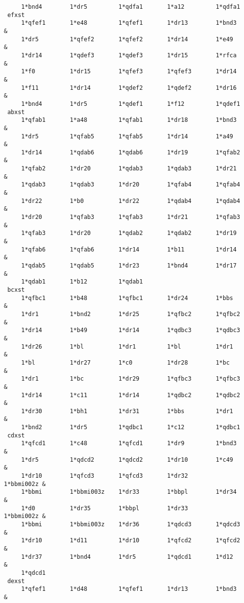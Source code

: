 \begin{footnotesize}
\begin{verbatim}
     1*bnd4        1*dr5         1*qdfa1       1*a12         1*qdfa1
 efxst
     1*qfef1       1*e48         1*qfef1       1*dr13        1*bnd3     &
     1*dr5         1*qfef2       1*qfef2       1*dr14        1*e49      &
     1*dr14        1*qdef3       1*qdef3       1*dr15        1*rfca     &
     1*f0          1*dr15        1*qfef3       1*qfef3       1*dr14     &
     1*f11         1*dr14        1*qdef2       1*qdef2       1*dr16     &
     1*bnd4        1*dr5         1*qdef1       1*f12         1*qdef1
 abxst
     1*qfab1       1*a48         1*qfab1       1*dr18        1*bnd3     &
     1*dr5         1*qfab5       1*qfab5       1*dr14        1*a49      &
     1*dr14        1*qdab6       1*qdab6       1*dr19        1*qfab2    &
     1*qfab2       1*dr20        1*qdab3       1*qdab3       1*dr21     &
     1*qdab3       1*qdab3       1*dr20        1*qfab4       1*qfab4    &
     1*dr22        1*b0          1*dr22        1*qdab4       1*qdab4    &
     1*dr20        1*qfab3       1*qfab3       1*dr21        1*qfab3    &
     1*qfab3       1*dr20        1*qdab2       1*qdab2       1*dr19     &
     1*qfab6       1*qfab6       1*dr14        1*b11         1*dr14     &
     1*qdab5       1*qdab5       1*dr23        1*bnd4        1*dr17     &
     1*qdab1       1*b12         1*qdab1
 bcxst
     1*qfbc1       1*b48         1*qfbc1       1*dr24        1*bbs      &
     1*dr1         1*bnd2        1*dr25        1*qfbc2       1*qfbc2    &
     1*dr14        1*b49         1*dr14        1*qdbc3       1*qdbc3    &
     1*dr26        1*bl          1*dr1         1*bl          1*dr1      &
     1*bl          1*dr27        1*c0          1*dr28        1*bc       &
     1*dr1         1*bc          1*dr29        1*qfbc3       1*qfbc3    &
     1*dr14        1*c11         1*dr14        1*qdbc2       1*qdbc2    &
     1*dr30        1*bh1         1*dr31        1*bbs         1*dr1      &
     1*bnd2        1*dr5         1*qdbc1       1*c12         1*qdbc1
 cdxst
     1*qfcd1       1*c48         1*qfcd1       1*dr9         1*bnd3     &
     1*dr5         1*qdcd2       1*qdcd2       1*dr10        1*c49      &
     1*dr10        1*qfcd3       1*qfcd3       1*dr32        1*bbmi002z &
     1*bbmi        1*bbmi003z    1*dr33        1*bbpl        1*dr34     &
     1*d0          1*dr35        1*bbpl        1*dr33        1*bbmi002z &
     1*bbmi        1*bbmi003z    1*dr36        1*qdcd3       1*qdcd3    &
     1*dr10        1*d11         1*dr10        1*qfcd2       1*qfcd2    &
     1*dr37        1*bnd4        1*dr5         1*qdcd1       1*d12      &
     1*qdcd1
 dexst
     1*qfef1       1*d48         1*qfef1       1*dr13        1*bnd3     &

\end{verbatim}
\end{footnotesize}
